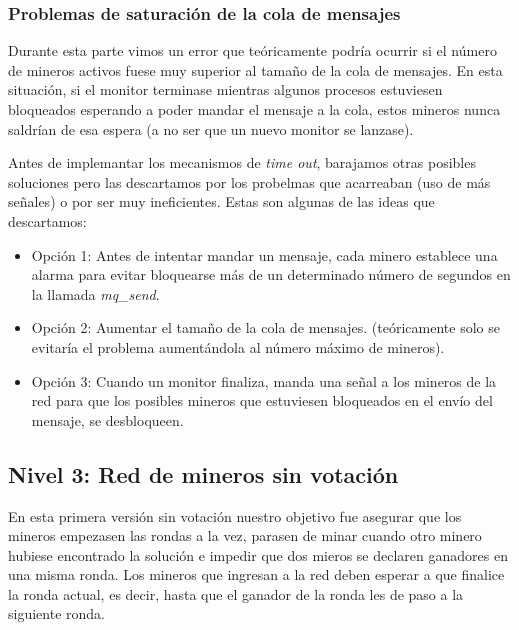\documentclass{article}
\begin{document}
    \subsubsection*{Problemas de saturación de la cola de mensajes}

    Durante esta parte vimos un error que teóricamente podría ocurrir si el número de mineros activos fuese muy superior al tamaño de la cola de mensajes. En esta situación, si el monitor terminase mientras algunos procesos estuviesen bloqueados esperando a poder mandar el mensaje a la cola, estos mineros nunca saldrían de esa espera (a no ser que un nuevo monitor se lanzase). 
    
    
 

    Antes de implemantar los mecanismos de \textit{time out}, barajamos otras posibles soluciones pero las descartamos por los probelmas que acarreaban (uso de más señales) o por ser muy ineficientes. Estas son algunas de las ideas que descartamos:

    \begin{itemize}
        \item Opción 1: Antes de intentar mandar un mensaje, cada minero establece una alarma para evitar bloquearse más de un determinado número de segundos en la llamada \textit{mq\_send}.
        \item Opción 2: Aumentar el tamaño de la cola de mensajes. (teóricamente solo se evitaría el problema aumentándola al número máximo de mineros).
        \item Opción 3: Cuando un monitor finaliza, manda una señal a los mineros de la red para que los posibles mineros que estuviesen bloqueados en el envío del mensaje, se desbloqueen. 
    \end{itemize}



\subsection*{Nivel 3: Red de mineros sin votación}

En esta primera versión sin votación nuestro objetivo fue asegurar que los mineros empezasen las rondas a la vez, parasen de minar cuando otro minero hubiese encontrado la solución e impedir que dos mieros se declaren ganadores en una misma ronda. Los mineros que ingresan a la red deben esperar a que finalice la ronda actual, es decir, hasta que el ganador de la ronda les de paso a la siguiente ronda.
\end{document}
